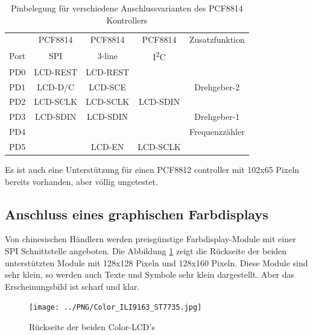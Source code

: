 \begin{table}[H]
  \begin{center}
    \begin{tabular}{| c || c | c | c | c |}
    \hline
           &  PCF8814    & PCF8814        & PCF8814     & Zusatzfunktion \\
      Port &    SPI      & 3-line         &   I\textsuperscript{2}C      & \\
    \hline
    \hline
    PD0    &   LCD-REST  & LCD-REST       &            & \\
    \hline
    PD1    &   LCD-D/C   & LCD-SCE        &             & Drehgeber-2 \\
    \hline
    PD2    &   LCD-SCLK  & LCD-SCLK       &  LCD-SDIN   & \\
    \hline
    PD3    &   LCD-SDIN  & LCD-SDIN       &             & Drehgeber-1 \\
    \hline
    PD4    &             &                &             & Frequenzzähler \\
    \hline
    PD5    &             & LCD-EN         &   LCD-SCLK  & \\
    \hline
    \end{tabular}
  \end{center}
  \caption{Pinbelegung für verschiedene Anschlussvarianten des PCF8814 Kontrollers}
  \label{tab:PCF8814-con}
\end{table}

Es ist auch eine Unterstützung für einen PCF8812 controller mit 102x65 Pixeln bereits vorhanden,
aber völlig ungetestet.

\subsection{Anschluss eines graphischen Farbdisplays}

Von chinesischen Händlern werden preisgünstige Farbdisplay-Module mit einer SPI Schnittstelle angeboten.
Die Abbildung \ref{fig:Color_both} zeigt die Rückseite der beiden unterstützten Module mit 128x128 Pixeln
und 128x160 Pixeln.
Diese Module sind sehr klein, so werden auch Texte und Symbole sehr klein dargestellt.
Aber das Erscheinungsbild ist scharf und klar.

\begin{figure}[H]
\centering
\texttt{[image: ../PNG/Color\_ILI9163\_ST7735.jpg]}	%
\caption{Rückseite der beiden Color-LCD's}
\label{fig:Color_both}
\end{figure}

